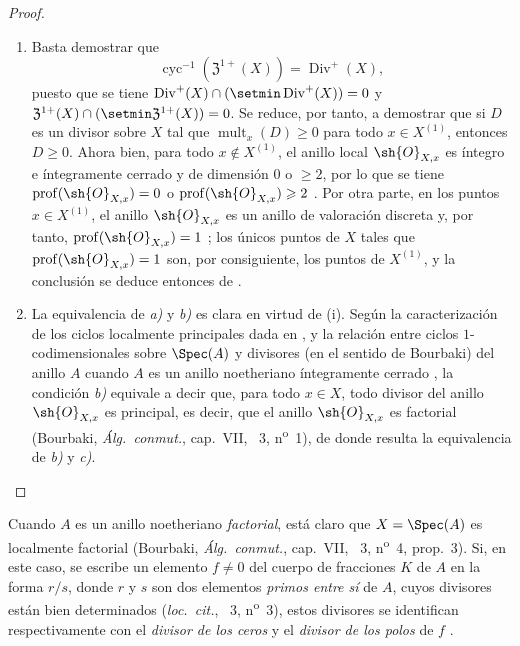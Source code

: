 \begin{proof}
\begin{enumerate}[label=(\roman*)]
  \item Basta demostrar que
\[
\label{IV.21.6.9.1}
  \operatorname{cyc}^{-1}(\mathfrak{Z}^{1+}(X))=\operatorname{Div}^+(X),
  \tag{21.6.9.1}
\]
puesto que se tiene $\operatorname{Div}^+(X)\cap(\setmin\operatorname{Div}^+(X))=0$ y $\mathfrak{Z}^{1+}(X)\cap(\setmin\mathfrak{Z}^{1+}(X))=0$.
Se reduce, por tanto, a demostrar que si $D$ es un divisor sobre $X$ tal que $\operatorname{mult}_x(D)\geq0$ para todo $x\in X^{(1)}$, entonces $D\geq0$.
Ahora bien, para todo $x\notin X^{(1)}$, el anillo local $\sh{O}_{X,x}$ es íntegro e íntegramente cerrado y
de dimensión $0$ o $\geq2$, por lo que se tiene $\operatorname{prof}(\sh{O}_{X,x})=0$ o $\operatorname{prof}(\sh{O}_{X,x})\geq2$ .
Por otra parte, en los puntos $x\in X^{(1)}$, el anillo $\sh{O}_{X,x}$ es un anillo de valoración discreta  y, por tanto, $\operatorname{prof}(\sh{O}_{X,x})=1$ ;
los únicos puntos de $X$ tales que $\operatorname{prof}(\sh{O}_{X,x})=1$ son, por consiguiente, los puntos de $X^{(1)}$, y la conclusión se deduce entonces de .

  \item La equivalencia de \emph{a)} y \emph{b)} es clara en virtud de (i).
Según la caracterización de los ciclos localmente principales dada en , y la relación entre ciclos $1$-codimensionales sobre $\Spec(A)$ y divisores (en el sentido de Bourbaki) del anillo $A$ cuando $A$ es un anillo noetheriano íntegramente cerrado , la condición \emph{b)} equivale a decir que, para todo $x\in X$, todo divisor del anillo $\sh{O}_{X,x}$ es principal, es decir, que el anillo $\sh{O}_{X,x}$ es factorial (Bourbaki, \emph{Álg.\ conmut.}, cap.~VII, \textsection~3, n\textsuperscript{o}~1), de donde resulta la equivalencia de \emph{b)} y \emph{c)}.
\end{enumerate}
\end{proof}

\begin{env}[21.6.9.2]
\label{IV.21.6.9.2}
Cuando $A$ es un anillo noetheriano \emph{factorial}, está claro que $X=\Spec(A)$ es localmente factorial (Bourbaki, \emph{Álg.\ conmut.}, cap.~VII, \textsection~3, n\textsuperscript{o}~4, prop.~3).
Si, en este caso, se escribe un elemento $f\neq0$ del cuerpo de fracciones $K$ de $A$ en la forma $r/s$, donde $r$ y $s$ son dos elementos \emph{primos entre sí} de $A$, cuyos divisores están bien determinados (\emph{loc.\ cit.}, \textsection~3, n\textsuperscript{o}~3), estos divisores se identifican respectivamente con el \emph{divisor de los ceros} y el \emph{divisor de los polos} de $f$ .
\end{env}

